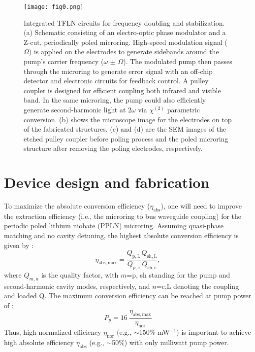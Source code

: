 \documentclass{WileyMSP-template}
\begin{document}
\begin{figure}
  \texttt{[image: fig0.png]}
  \caption{Integrated TFLN circuits for frequency doubling and stabilization. (a) Schematic consisting of an electro-optic phase modulator and a Z-cut, periodically poled microring. High-speed modulation signal ($\Omega$) is applied on the electrodes to generate sidebands around the pump's carrier frequency ($\omega$ $\pm$ $\Omega$). The modulated pump then passes through the microring to generate error signal with an off-chip detector and electronic circuits for feedback control. A pulley coupler is designed for efficient coupling both infrared and visible band. In the same microring, the pump could also efficiently generate second-harmonic light at $2\omega$ via $\chi^{(2)}$ parametric conversion. (b) shows the microscope image for the electrodes on top of the fabricated structures. (c) and (d) are the SEM images of the etched pulley coupler before poling process and the poled microring structure after removing the poling electrodes, respectively.}
  \label{fig0}
\end{figure}

\section{Device design and fabrication}
To maximize the absolute conversion efficiency ($\eta_\mathrm{abs}$), one will need to improve the extraction efficiency (i.e., the microring to bus waveguide coupling) for the periodic poled lithium niobate (PPLN) microring. Assuming quasi-phase matching and no cavity detuning, the highest absolute conversion efficiency is given by \cite{lu2019periodically, breunig2016three}:
\begin{equation}
  \eta_\mathrm{abs, max} = \frac{Q_\mathrm{p,L}}{Q_\mathrm{p,c}} \frac{Q_\mathrm{sh,L}}{Q_\mathrm{sh,c}},
  \label{eq1}
\end{equation}
where $Q_{m,n}$ is the quality factor, with $m$=p, sh standing for the pump and second-harmonic cavity modes, respectively, and $n$=c,L denoting the coupling and loaded Q. The maximum conversion efficiency can be reached at pump power of \cite{lu2019periodically, breunig2016three}:
\begin{equation}
P_p = 16~ \frac{\eta_\mathrm{abs, max}}{\eta_\mathrm{nor}}
\end{equation}
Thus, high normalized efficiency $\eta_\mathrm{nor}$ (e.g., $\sim$150$\%$ mW$^{-1}$) is important to achieve high absolute efficiency $\eta_\mathrm{abs}$ (e.g., $\sim$50$\%$) with only milliwatt pump power.
\end{document}
